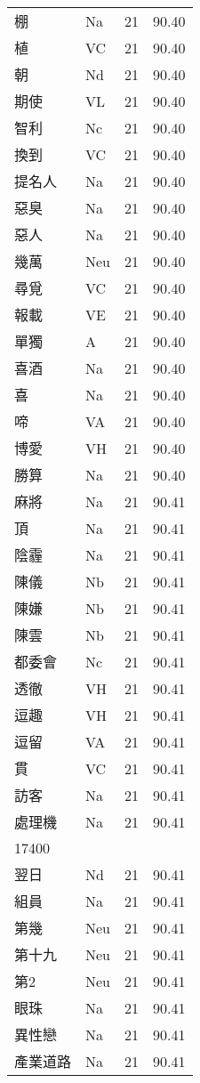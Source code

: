 \documentclass[twocolumn]{book}
\begin{document}
\begin{supertabular}{llrr}
棚 & Na & 21 &  90.40\\
植 & VC & 21 &  90.40\\
朝 & Nd & 21 &  90.40\\
期使 & VL & 21 &  90.40\\
智利 & Nc & 21 &  90.40\\
換到 & VC & 21 &  90.40\\
提名人 & Na & 21 &  90.40\\
惡臭 & Na & 21 &  90.40\\
惡人 & Na & 21 &  90.40\\
幾萬 & Neu & 21 &  90.40\\
尋覓 & VC & 21 &  90.40\\
報載 & VE & 21 &  90.40\\
單獨 & A & 21 &  90.40\\
喜酒 & Na & 21 &  90.40\\
喜 & Na & 21 &  90.40\\
啼 & VA & 21 &  90.40\\
博愛 & VH & 21 &  90.40\\
勝算 & Na & 21 &  90.40\\
麻將 & Na & 21 &  90.41\\
頂 & Na & 21 &  90.41\\
陰霾 & Na & 21 &  90.41\\
陳儀 & Nb & 21 &  90.41\\
陳嫌 & Nb & 21 &  90.41\\
陳雲 & Nb & 21 &  90.41\\
都委會 & Nc & 21 &  90.41\\
透徹 & VH & 21 &  90.41\\
逗趣 & VH & 21 &  90.41\\
逗留 & VA & 21 &  90.41\\
貫 & VC & 21 &  90.41\\
訪客 & Na & 21 &  90.41\\
處理機 & Na & 21 &  90.41\\
17400\\
翌日 & Nd & 21 &  90.41\\
組員 & Na & 21 &  90.41\\
第幾 & Neu & 21 &  90.41\\
第十九 & Neu & 21 &  90.41\\
第2 & Neu & 21 &  90.41\\
眼珠 & Na & 21 &  90.41\\
異性戀 & Na & 21 &  90.41\\
產業道路 & Na & 21 &  90.41\\

\end{supertabular}
\end{document}
